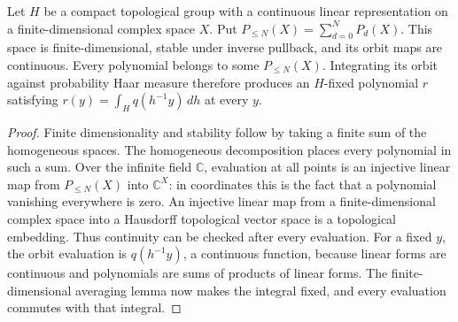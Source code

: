 \begin{lemma}
\label{lem:balanced-bounded-polynomial-average}
\leanok
{}
Let $H$ be a compact topological group with a continuous linear representation
on a finite-dimensional complex space $X$. Put
$P_{\leq N}(X)=\sum_{d=0}^N P_d(X)$. This space is finite-dimensional,
stable under inverse pullback, and its orbit maps are continuous.
Every polynomial belongs to some $P_{\leq N}(X)$. Integrating its orbit
against probability Haar measure therefore produces an $H$-fixed polynomial
$r$ satisfying $r(y)=\int_H q(h^{-1}y)\,dh$ at every $y$.
\end{lemma}
\begin{proof}
Finite dimensionality and stability follow by taking a finite sum of the
homogeneous spaces. The homogeneous decomposition places every polynomial
in such a sum. Over the infinite field $\mathbb C$, evaluation at all
points is an injective linear map from $P_{\leq N}(X)$ into
$\mathbb C^X$: in coordinates this is the fact that a polynomial vanishing
everywhere is zero. An injective linear map from a finite-dimensional
complex space into a Hausdorff topological vector space is a topological
embedding. Thus continuity can be checked after every evaluation.
For a fixed $y$, the orbit evaluation is $q(h^{-1}y)$, a continuous
function, because linear forms are continuous and polynomials are sums
of products of linear forms. The finite-dimensional averaging lemma now
makes the integral fixed, and every evaluation commutes with that integral.
\end{proof}

